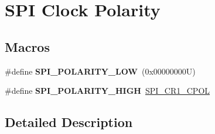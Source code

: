\hypertarget{group___s_p_i___clock___polarity}{}\section{S\+PI Clock Polarity}
\label{group___s_p_i___clock___polarity}
\subsection*{Macros}
\begin{DoxyCompactItemize}
\item 
\mbox{\label{group___s_p_i___clock___polarity_gaf61e3c6ec671baef099516265793c8df}} 
\#define {\bfseries S\+P\+I\+\_\+\+P\+O\+L\+A\+R\+I\+T\+Y\+\_\+\+L\+OW}~(0x00000000\+U)
\item 
\mbox{\label{group___s_p_i___clock___polarity_ga6910e2527b7511eb3a55946b9b775cff}} 
\#define {\bfseries S\+P\+I\+\_\+\+P\+O\+L\+A\+R\+I\+T\+Y\+\_\+\+H\+I\+GH}~\hyperlink{group___peripheral___registers___bits___definition_ga2616a10f5118cdc68fbdf0582481e124}{S\+P\+I\+\_\+\+C\+R1\+\_\+\+C\+P\+OL}
\end{DoxyCompactItemize}


\subsection{Detailed Description}
